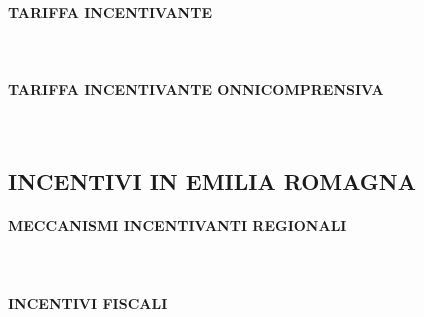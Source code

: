 \documentclass[12pt,a4paper,openright,twoside]{report}
\newcommand{\myparagraph}[1]{\paragraph{#1}\mbox{}\\}
\begin{document}
\myparagraph{TARIFFA INCENTIVANTE}

\myparagraph{TARIFFA INCENTIVANTE ONNICOMPRENSIVA}

\subsection[INCENTIVI REGIONALI]{\nohyphens{INCENTIVI IN EMILIA ROMAGNA}}

\myparagraph{MECCANISMI INCENTIVANTI REGIONALI}

\myparagraph{INCENTIVI FISCALI}


\nocite{*}


\end{document}
